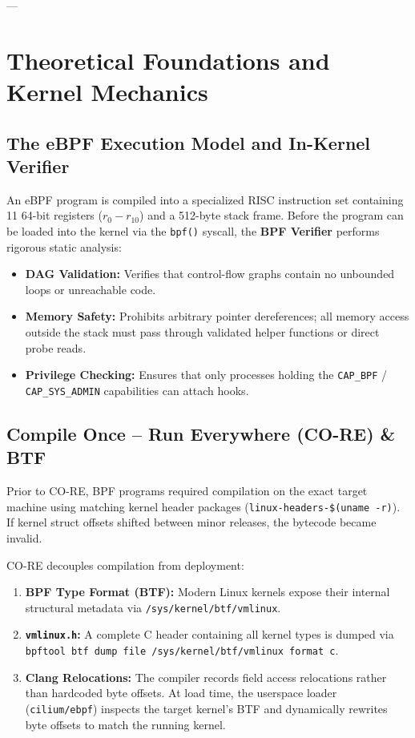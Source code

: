\documentclass[11pt,a4paper]{article}
\begin{document}
---

\section{Theoretical Foundations and Kernel Mechanics}

\subsection{The eBPF Execution Model and In-Kernel Verifier}
An eBPF program is compiled into a specialized RISC instruction set containing 11 64-bit registers ($r_0 - r_{10}$) and a 512-byte stack frame. Before the program can be loaded into the kernel via the \texttt{bpf()} syscall, the \textbf{BPF Verifier} performs rigorous static analysis:
\begin{itemize}
    \item \textbf{DAG Validation:} Verifies that control-flow graphs contain no unbounded loops or unreachable code.
    \item \textbf{Memory Safety:} Prohibits arbitrary pointer dereferences; all memory access outside the stack must pass through validated helper functions or direct probe reads.
    \item \textbf{Privilege Checking:} Ensures that only processes holding the \texttt{CAP\_BPF} / \texttt{CAP\_SYS\_ADMIN} capabilities can attach hooks.
\end{itemize}

\subsection{Compile Once -- Run Everywhere (CO-RE) \& BTF}
Prior to CO-RE, BPF programs required compilation on the exact target machine using matching kernel header packages (\texttt{linux-headers-\$(uname -r)}). If kernel struct offsets shifted between minor releases, the bytecode became invalid. 

CO-RE decouples compilation from deployment:
\begin{enumerate}
    \item \textbf{BPF Type Format (BTF):} Modern Linux kernels expose their internal structural metadata via \texttt{/sys/kernel/btf/vmlinux}.
    \item \textbf{\texttt{vmlinux.h}:} A complete C header containing all kernel types is dumped via \texttt{bpftool btf dump file /sys/kernel/btf/vmlinux format c}.
    \item \textbf{Clang Relocations:} The compiler records field access relocations rather than hardcoded byte offsets. At load time, the userspace loader (\texttt{cilium/ebpf}) inspects the target kernel's BTF and dynamically rewrites byte offsets to match the running kernel.
\end{enumerate}
\end{document}
